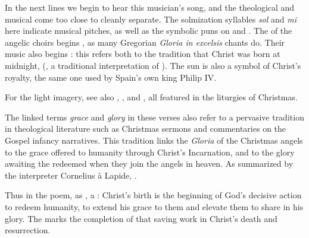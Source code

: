 In the next lines we begin to hear this musician's song, and the theological and
musical come too close to cleanly separate.
The solmization syllables \emph{sol} and \emph{mi} here indicate musical
pitches, as well as the symbolic puns on  and .
The  of the angelic choirs begins , as many
Gregorian \emph{Gloria in excelsis} chants do. 
Their music also begins : this refers both to the tradition
that Christ was born at midnight, 
(, a traditional interpretation of ).%
    \Autocite
    [37: .]
    {LuisdeGranada:Xmas}
The sun is also a symbol of Christ's royalty, the same one used by Spain's own
king Philip IV.%
\begin{Footnote}
    For the light imagery, see also , , and
    , all featured in the liturgies of Christmas.
\end{Footnote}

The linked terms \emph{grace} and \emph{glory} in these verses also refer to
a pervasive tradition in theological literature such as Christmas sermons and
commentaries on the Gospel infancy narratives.
This tradition links the \emph{Gloria} of the Christmas angels to the grace
offered to humanity through Christ's Incarnation, and to the glory awaiting the
redeemed when they join the angels in heaven.
As summarized by the interpreter Cornelius à Lapide, .%
    \Autocites
    [878, on :
    .]
    {Lapide:Gospels19C}
    [Cf.] 
    [98, Sermo 185, In Natali Domini 2, in connection with ]
    {Augustine:SermonesPL}

Thus in the poem, as , a : Christ's
birth is the beginning of God's decisive action to redeem humanity, to extend
his grace to them and elevate them to share in his glory.
The  marks the completion of that saving work in Christ's
death and resurrection.

